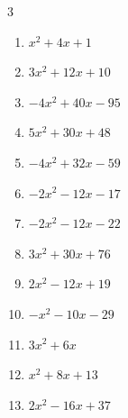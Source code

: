 \begin{multicols}{3}
\begin{enumerate}

  \item $x^{2}+4x+1$


  \item $3x^{2}+12x+10$


\columnbreak %

\resetques

  \item $-4x^{2}+40x-95$


  \item $5x^{2}+30x+48$


  \item $-4x^{2}+32x-59$


  \item $-2x^{2}-12x-17$


  \item $-2x^{2}-12x-22$


  \item $3x^{2}+30x+76$


  \item $2x^{2}-12x+19$


  \item $-x^{2}-10x-29$


  \item $3x^{2}+6x$


  \item $x^{2}+8x+13$


\columnbreak %

  \item $2x^{2}-16x+37$


\end{enumerate}
\end{multicols}
